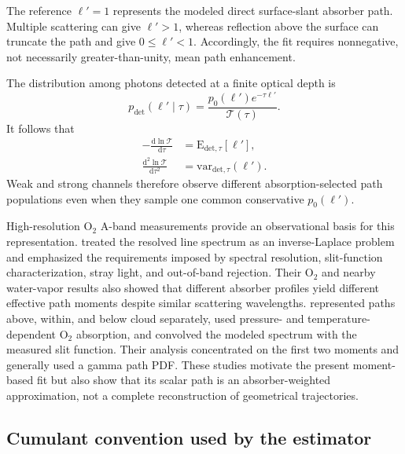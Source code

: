 The reference $\ell'=1$ represents the modeled direct surface-slant absorber
path.  Multiple scattering can give $\ell'>1$, whereas reflection above the
surface can truncate the path and give $0\leq\ell'<1$.  Accordingly, the fit
requires nonnegative, not necessarily greater-than-unity, mean path
enhancement.

The distribution among photons detected at a finite optical depth is
\begin{equation}
  p_{\mathrm{det}}(\ell'\mid\tau)
  = \frac{p_0(\ell')e^{-\tau\ell'}}
         {\mathcal T(\tau)}.
  \label{eq:app_detected_pdf}
\end{equation}
It follows that
\begin{align}
  -\frac{\mathrm{d}\ln\mathcal T}{\mathrm{d}\tau}
  &= \mathrm{E}_{\mathrm{det},\tau}[\ell'],
  \label{eq:app_detected_mean}\\
  \frac{\mathrm{d}^2\ln\mathcal T}{\mathrm{d}\tau^2}
  &= \mathrm{var}_{\mathrm{det},\tau}(\ell').
  \label{eq:app_detected_variance}
\end{align}
Weak and strong channels therefore observe different absorption-selected path
populations even when they sample one common conservative $p_0(\ell')$.

High-resolution O$_2$ A-band measurements provide an observational basis for
this representation.  \citet{min2004} treated the resolved line spectrum as an
inverse-Laplace problem and emphasized the requirements imposed by spectral
resolution, slit-function characterization, stray light, and out-of-band
rejection.  Their O$_2$ and nearby water-vapor results also showed that
different absorber profiles yield different effective path moments despite
similar scattering wavelengths.  \citet{scholl2006} represented paths above,
within, and below cloud separately, used pressure- and temperature-dependent
O$_2$ absorption, and convolved the modeled spectrum with the measured slit
function.  Their analysis concentrated on the first two moments and generally
used a gamma path PDF.  These studies motivate the present moment-based fit but
also show that its scalar path is an absorber-weighted approximation, not a
complete reconstruction of geometrical trajectories.

\subsection{Cumulant convention used by the estimator}
\label{app:cumulants}

